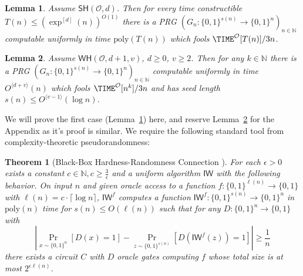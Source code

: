 \documentclass[11pt]{article}
\newtheorem{theorem}{Theorem}
\newtheorem{lemma}{Lemma}
\newcommand{\B}{\{0,1\}}
\newcommand{\od}[1]{O^{\langle #1 \rangle}}
\newcommand{\SH}{\mathsf{SH}}
\newcommand{\WH}{\mathsf{WH}}
\renewcommand{\poly}{\mathrm{poly}}
\begin{document}
\begin{lemma}\label{lem:polytime-prg-from-compression}
Assume $\SH(\mathcal{O},d)$. Then for every time constructible $T(n) \leq (\exp^{[d]}(n))^{O(1)}$ there is a PRG $(G_n: \B^{s(n)} \to \B^n)_{n \in \mathbb{N}}$ computable uniformly in time $\poly(T(n))$ which fools $\TIME^{\mathcal{O}}[T(n)]/3n$.
\end{lemma}
\begin{lemma}\label{lem:weak-prg-from-hardness}
Assume $\WH(\mathcal{O},d+1,v)$, $d\geq 0$, $v \geq 2$. Then for any $k\in \mathbb{N}$ there is a PRG $(G_n: \B^{s(n)} \to \B^n)_{n \in \mathbb{N}}$ computable uniformly in time $\od{d+v}(n)$ which fools $\TIME^{\mathcal{O}}[n^k]/3n$ and has seed length $s(n) \leq \od{v-1}(\log n)$. 
\end{lemma}
We will prove the first case (Lemma~\ref{lem:polytime-prg-from-compression}) here, and reserve Lemma~\ref{lem:weak-prg-from-hardness} for the Appendix as it's proof is similar. We require the following standard tool from complexity-theoretic pseudorandomness:
\begin{theorem}[Black-Box Hardness-Randomness Connection \cite{IW97}]\label{thm:IW-generalized}
For each $\epsilon > 0$ exists a constant $c \in \mathbb{N}, c \geq \frac{3}{\epsilon}$ and a uniform algorithm $\mathsf{IW}$ with the following behavior. On input $n$ and given oracle access to a function $f: \B^{\ell(n)} \to \B$ with $\ell(n) = c \cdot \lceil \log n \rceil $, $\mathsf{IW}^f$ computes a function $\mathsf{IW}^f: \B^{s(n)} \to \B^n$ in $\poly(n)$ time for $s(n) \leq O(\ell(n))$ such that for any $D: \B^n \to \B$ with
\[
|\Pr_{x \sim \B^n}[ D(x) = 1] - \Pr_{z \sim \B^{s(n)}}[D(\mathsf{IW}^f(z)) = 1]| \geq \frac{1}{n}
\]
there exists a circuit $C$ with $D$ oracle gates computing $f$ whose total size is at most $2^{\epsilon \ell(n)}$.
\end{theorem}
\end{document}
